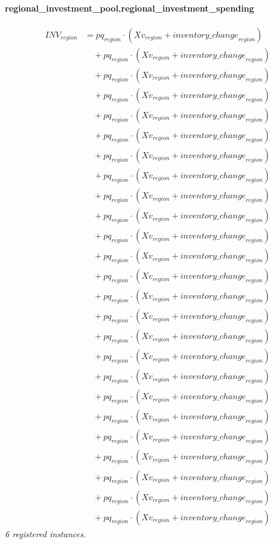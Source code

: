 \documentclass[11pt]{article}
\begin{document}
\paragraph{regional\_investment\_pool.regional\_investment\_spending}
\begin{align*}
INV_{region} &= pq_{region} \cdot (Xv_{region} + {inventory\_change}_{region})\\
&\quad {}+ pq_{region} \cdot (Xv_{region} + {inventory\_change}_{region})\\
&\quad {}+ pq_{region} \cdot (Xv_{region} + {inventory\_change}_{region})\\
&\quad {}+ pq_{region} \cdot (Xv_{region} + {inventory\_change}_{region})\\
&\quad {}+ pq_{region} \cdot (Xv_{region} + {inventory\_change}_{region})\\
&\quad {}+ pq_{region} \cdot (Xv_{region} + {inventory\_change}_{region})\\
&\quad {}+ pq_{region} \cdot (Xv_{region} + {inventory\_change}_{region})\\
&\quad {}+ pq_{region} \cdot (Xv_{region} + {inventory\_change}_{region})\\
&\quad {}+ pq_{region} \cdot (Xv_{region} + {inventory\_change}_{region})\\
&\quad {}+ pq_{region} \cdot (Xv_{region} + {inventory\_change}_{region})\\
&\quad {}+ pq_{region} \cdot (Xv_{region} + {inventory\_change}_{region})\\
&\quad {}+ pq_{region} \cdot (Xv_{region} + {inventory\_change}_{region})\\
&\quad {}+ pq_{region} \cdot (Xv_{region} + {inventory\_change}_{region})\\
&\quad {}+ pq_{region} \cdot (Xv_{region} + {inventory\_change}_{region})\\
&\quad {}+ pq_{region} \cdot (Xv_{region} + {inventory\_change}_{region})\\
&\quad {}+ pq_{region} \cdot (Xv_{region} + {inventory\_change}_{region})\\
&\quad {}+ pq_{region} \cdot (Xv_{region} + {inventory\_change}_{region})\\
&\quad {}+ pq_{region} \cdot (Xv_{region} + {inventory\_change}_{region})\\
&\quad {}+ pq_{region} \cdot (Xv_{region} + {inventory\_change}_{region})\\
&\quad {}+ pq_{region} \cdot (Xv_{region} + {inventory\_change}_{region})\\
&\quad {}+ pq_{region} \cdot (Xv_{region} + {inventory\_change}_{region})\\
&\quad {}+ pq_{region} \cdot (Xv_{region} + {inventory\_change}_{region})\\
&\quad {}+ pq_{region} \cdot (Xv_{region} + {inventory\_change}_{region})\\
&\quad {}+ pq_{region} \cdot (Xv_{region} + {inventory\_change}_{region})\\
&\quad {}+ pq_{region} \cdot (Xv_{region} + {inventory\_change}_{region})
\end{align*}
\noindent\emph{6 registered instances.}\par
\end{document}
